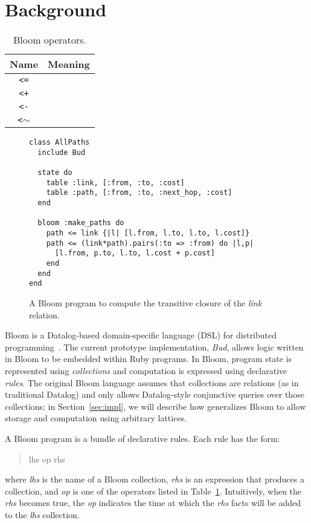 \section{Background}
\label{sec:background}
\begin{table}
\begin{tabular}{|c|l|}
\hline
\textbf{Name} & \textbf{Meaning} \\
\hline
\verb|<=| &  \\
\hline
\verb|<+| &  \\
\hline
\verb|<-| &  \\
\hline
\verb|<|$\sim$ &  \\
\hline
\end{tabular}
\caption{Bloom operators.}
\label{tbl:bloom-ops}
\end{table}

\begin{figure}[t]
\begin{scriptsize}
\begin{lstlisting}
class AllPaths
  include Bud

  state do
    table :link, [:from, :to, :cost]
    table :path, [:from, :to, :next_hop, :cost]
  end

  bloom :make_paths do
    path <= link {|l| [l.from, l.to, l.to, l.cost]}
    path <= (link*path).pairs(:to => :from) do |l,p|
      [l.from, p.to, l.to, l.cost + p.cost]
    end
  end
end
\end{lstlisting}
\end{scriptsize}
\caption{A Bloom program to compute the transitive closure of the
  \emph{link} relation.}
\label{fig:bloom-spaths}
\end{figure}

Bloom is a Datalog-based domain-specific language (DSL) for distributed
programming~\cite{Alvaro2011,bloom}. The current prototype implementation,
\emph{Bud}, allows logic written in Bloom to be embedded within Ruby
programs. In Bloom, program state is represented using \emph{collections} and
computation is expressed using declarative \emph{rules}. The original Bloom
language assumes that collections are relations (as in traditional Datalog) and
only allows Datalog-style conjunctive queries over those collections; in
Section~\ref{sec:impl}, we will describe how \lang generalizes Bloom to allow
storage and computation using arbitrary lattices.

A Bloom program is a bundle of declarative rules. Each rule has the form:
\begin{quotation}
lhs op rhs
\end{quotation}
where \emph{lhs} is the name of a Bloom collection, \emph{rhs} is an expression
that produces a collection, and \emph{op} is one of the operators listed in
Table~\ref{tbl:bloom-ops}. Intuitively, when the \emph{rhs} becomes true, the
\emph{op} indicates the time at which the \emph{rhs} facts will be added to the
\emph{lhs} collection.

